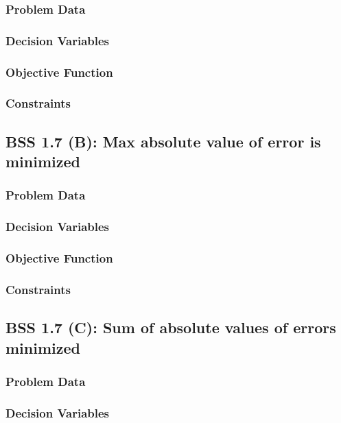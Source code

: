 \documentclass[12pt]{article}
\begin{document}
\subsubsection{Problem Data}

\subsubsection{Decision Variables}

\subsubsection{Objective Function}

\subsubsection{Constraints}

\subsection{BSS 1.7 (B): Max absolute value of error is minimized}
\subsubsection{Problem Data}

\subsubsection{Decision Variables}

\subsubsection{Objective Function}

\subsubsection{Constraints}

\subsection{BSS 1.7 (C): Sum of absolute values of errors minimized}
\subsubsection{Problem Data}

\subsubsection{Decision Variables}
\end{document}
